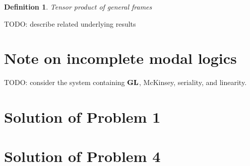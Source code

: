 \documentclass[a4paper]{article}
\theoremstyle{defin}
\newtheorem{defin}{Definition}
\theoremstyle{theorem}
\theoremstyle{prop}
\theoremstyle{lemma}
\theoremstyle{ex}
\theoremstyle{col}
\begin{document}
\begin{defin} Tensor product of general frames
\end{defin}

TODO: describe related underlying results

\section{Note on incomplete modal logics}

TODO: consider the system containing ${\bf GL}$, McKinsey, seriality, and linearity.

\section{Solution of Problem 1}

\section{Solution of Problem 4}



\end{document}
